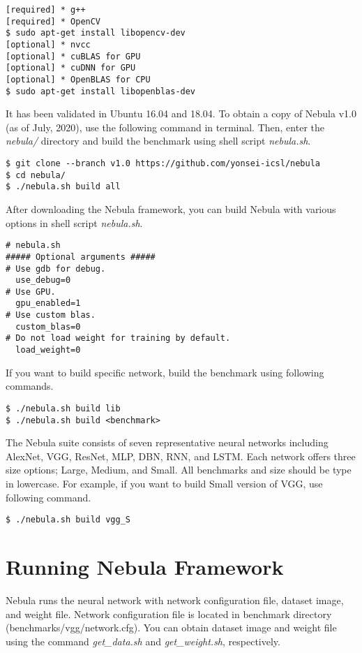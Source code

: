 \documentclass[10pt]{article}
\begin{document}
\begin{Verbatim}[frame=single,fontsize=\small]
[required] * g++
[required] * OpenCV
$ sudo apt-get install libopencv-dev
[optional] * nvcc
[optional] * cuBLAS for GPU 
[optional] * cuDNN for GPU
[optional] * OpenBLAS for CPU
$ sudo apt-get install libopenblas-dev
\end{Verbatim}

It has been validated in Ubuntu 16.04 and 18.04.
To obtain a copy of Nebula v1.0 (as of July, 2020), use the following command in terminal.
Then, enter the \emph{nebula/} directory and build the benchmark using shell script \emph{nebula.sh}.

\begin{Verbatim}[frame=single,fontsize=\small]
$ git clone --branch v1.0 https://github.com/yonsei-icsl/nebula
$ cd nebula/
$ ./nebula.sh build all
\end{Verbatim}

After downloading the Nebula framework, you can build Nebula with various options in shell script \emph{nebula.sh}.

\begin{Verbatim}[frame=single,fontsize=\small]
# nebula.sh
##### Optional arguments #####
# Use gdb for debug.
  use_debug=0
# Use GPU.
  gpu_enabled=1
# Use custom blas.
  custom_blas=0
# Do not load weight for training by default.
  load_weight=0
\end{Verbatim}
If you want to build specific network, build the benchmark using following commands.
\begin{Verbatim}[frame=single,fontsize=\small]
$ ./nebula.sh build lib
$ ./nebula.sh build <benchmark>
\end{Verbatim}
The Nebula suite consists of seven representative neural networks including AlexNet, VGG, ResNet, MLP, DBN, RNN, and LSTM.
Each network offers three size options; Large, Medium, and Small.
All benchmarks and size should be type in lowercase.
For example, if you want to build Small version of VGG, use following command.

\begin{Verbatim}[frame=single,fontsize=\small]
$ ./nebula.sh build vgg_S
\end{Verbatim}

\section{Running Nebula Framework} \label{sec:running}

Nebula runs the neural network with network configuration file, dataset image, and weight file.
Network configuration file is located in benchmark directory (benchmarks/vgg/network.cfg).
You can obtain dataset image and weight file using the command \emph{get\_data.sh} and \emph{get\_weight.sh}, respectively.
\end{document}
